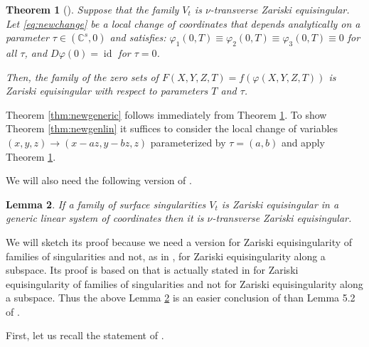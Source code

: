 \documentclass[11pt,a4paper]{amsart}
\newcommand{\1}{{1\!\!1}}
\numberwithin{equation}{section}
\theoremstyle{plain}%
\newtheorem{thm}{Theorem}[section]
\newtheorem{lem}[thm]{Lemma}
\theoremstyle{definition}
\newtheorem{rmk}[thm]{Remark}
\theoremstyle{definition}
\theoremstyle{remark}
\newcommand{\C}{\mathbb{C}}
\renewcommand{\1}{\mathbf{1}}
\DeclareMathOperator{\id}{id}
\newcommand{\impli}{\varphi}
\newcommand{\unt}{$\nu$-transverse }
\begin{document}
\begin{thm}[{\cite[Theorem 4.6]{PP24}}] \label{thm:newgenericwithparameter}
Suppose that the family $V_t$  is  \unt   Zariski equisingular.  Let \eqref{eq:newchange} be a local change of coordinates that depends analytically on a  parameter $\tau\in (\C^s,0)$ and satisfies:  $\impli_1 (0,T)\equiv \impli_2 (0,T)\equiv \impli_3 (0,T) \equiv 0$ for all $\tau$, and $D\varphi (0)=\id$ for $\tau =0$.  

Then, the family of the zero sets of $F (X, Y, Z, T)= f(\impli (X,Y,Z,T))$ is Zariski equisingular
 with respect to  parameters  $T$ and $\tau$.  
\end{thm} 



Theorem \ref{thm:newgeneric} follows immediately from 
Theorem \ref{thm:newgenericwithparameter}.  To show 
Theorem \ref{thm:newgenlin} it suffices to consider the local change of variables 
$(x,y,z) \to (x-az,y-bz, z)$ parameterized by $\tau =(a,b)$ and apply Theorem \ref{thm:newgenericwithparameter}. 



We will also need the following version of \cite[Lemma 5.2]{PP24}.  

\begin{lem}\label{newlem:(4)==>(1)}
If a family of surface singularities $V_t$ is Zariski equisingular in a generic linear system of coordinates then it is  \unt Zariski equisingular.  
\end{lem}

We will sketch its proof because we need a version for Zariski equisingularity of families of singularities and not, as in \cite[Lemma 5.2]{PP24}, for Zariski equisingularity along a subspace.  
Its proof is based on  \cite[Proposition 3.7]{PP24} that is actually stated in \cite{PP24} for 
Zariski equisingularity of families of singularities and not for Zariski equisingularity along a subspace. Thus the above Lemma \ref{newlem:(4)==>(1)} is an easier conclusion of \cite[Proposition 3.7]{PP24} than Lemma 5.2 of \cite{PP24}. 

First, let us recall the statement of \cite[Proposition 3.7]{PP24}. 
\end{document}
